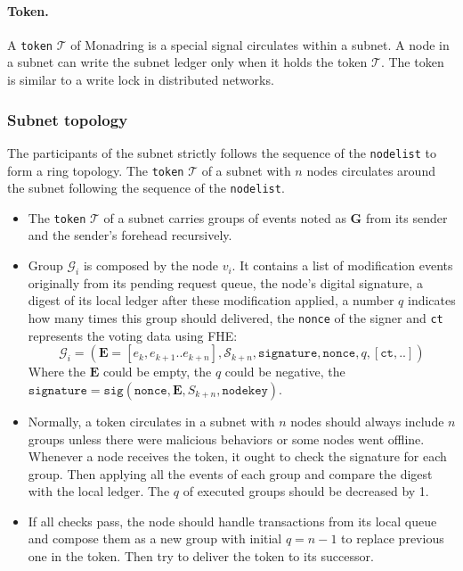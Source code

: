 \documentclass[11pt]{article}
\begin{document}
\paragraph{Token.} A \texttt{token} $\mathcal{T}$ of Monadring is a special signal circulates within a subnet.
A node in a subnet can write the subnet ledger only when it holds the token $\mathcal{T}$. The token is similar to a write lock in distributed networks.

\subsubsection{Subnet topology}
The participants of the subnet strictly follows the sequence of the \texttt{nodelist} to form a ring topology.
The \texttt{token} $\mathcal{T}$ of a subnet with $n$ nodes circulates around the subnet following the sequence of the \texttt{nodelist}.

\begin{itemize}
\item The \texttt{token} $\mathcal{T}$ of a subnet carries groups of events noted as $\mathbf{G}$ from its sender and the sender{'}s forehead recursively.
\item Group $\mathcal{G}_{i}$ is composed by the node $v_{i}$. It contains a list of modification events originally from its pending request queue, the node{'}s digital signature, a digest of its local ledger after these modification applied, a number $q$ indicates how many times this group should delivered, the \texttt{nonce} of the signer and \texttt{ct} represents the voting data using FHE:
\begin{equation}
\mathcal{G}_{i} = (\mathbf{E} = [e_{k}, e_{k+1}..e_{k+n}], \mathcal{S}_{k+n}, \texttt{signature}, \texttt{nonce}, q, [\texttt{ct},..])
\end{equation}
Where the $\mathbf{E}$ could be empty, the $q$ could be negative, the \(\texttt{signature} = \texttt{sig}(\texttt{nonce}, \mathbf{E}, S_{k+n}, \texttt{nodekey})\).

\item Normally, a token circulates in a subnet with $n$ nodes should always include $n$ groups unless there were malicious behaviors or some nodes went offline.
Whenever a node receives the token, it ought to check the signature for each group.
Then applying all the events of each group and compare the digest with the local ledger.
The $q$ of executed groups should be decreased by 1.

\item If all checks pass, the node should handle transactions from its local queue and compose them as a new group with initial $q=n-1$ to replace previous one in the token.
Then try to deliver the token to its successor.
\end{itemize}
\end{document}
